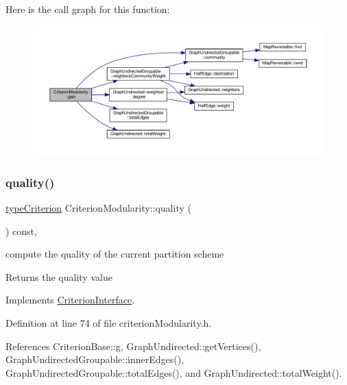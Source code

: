Here is the call graph for this function\+:
\nopagebreak
\begin{figure}[H]
\begin{center}
\leavevmode
\includegraphics[width=350pt]{classCriterionModularity_a181617050bab1eeaaf38b2ad30dcfc43_cgraph}
\end{center}
\end{figure}
\mbox{\label{classCriterionModularity_adf9197fd4e5878ca86501447b1fba989}} 
\subsubsection{\texorpdfstring{quality()}{quality()}}
{\footnotesize\ttfamily \hyperlink{criterionInterface_8h_af71ff22f6355fd69a4a62104bfd59a83}{type\+Criterion} Criterion\+Modularity\+::quality (\begin{DoxyParamCaption}{ }\end{DoxyParamCaption}) const\hspace{0.3cm}{\ttfamily [inline]}, {\ttfamily [virtual]}}

compute the quality of the current partition scheme

\begin{DoxyReturn}{Returns}
the quality value 
\end{DoxyReturn}


Implements \hyperlink{classCriterionInterface_a5d287dc7755f7ce7d6a3d91f0d8fa5de}{Criterion\+Interface}.



Definition at line 74 of file criterion\+Modularity.\+h.



References Criterion\+Base\+::g, Graph\+Undirected\+::get\+Vertices(), Graph\+Undirected\+Groupable\+::inner\+Edges(), Graph\+Undirected\+Groupable\+::total\+Edges(), and Graph\+Undirected\+::total\+Weight().



